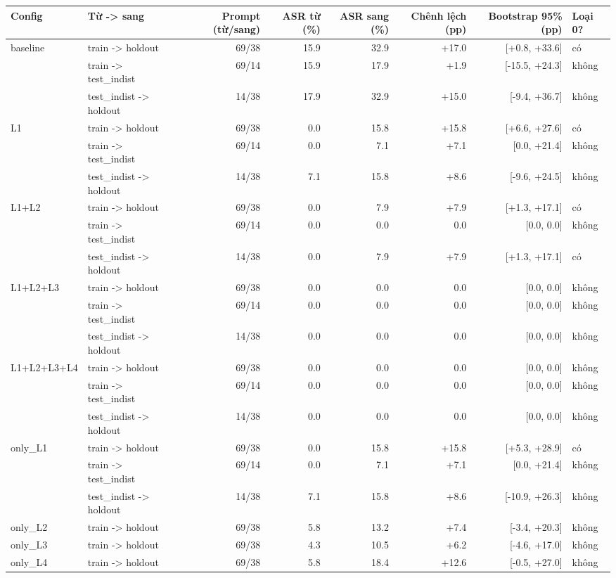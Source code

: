 \begin{tabular}{llrrrrrl}
\toprule
Config & Từ -> sang & Prompt (từ/sang) & ASR từ (\%) & ASR sang (\%) & Chênh lệch (pp) & Bootstrap 95\% (pp) & Loại 0? \\
\midrule
baseline & train -> holdout & 69/38 & 15.9 & 32.9 & +17.0 & [+0.8, +33.6] & có \\
 & train -> test\_indist & 69/14 & 15.9 & 17.9 & +1.9 & [-15.5, +24.3] & không \\
 & test\_indist -> holdout & 14/38 & 17.9 & 32.9 & +15.0 & [-9.4, +36.7] & không \\
\midrule
L1 & train -> holdout & 69/38 & 0.0 & 15.8 & +15.8 & [+6.6, +27.6] & có \\
 & train -> test\_indist & 69/14 & 0.0 & 7.1 & +7.1 & [0.0, +21.4] & không \\
 & test\_indist -> holdout & 14/38 & 7.1 & 15.8 & +8.6 & [-9.6, +24.5] & không \\
\midrule
L1+L2 & train -> holdout & 69/38 & 0.0 & 7.9 & +7.9 & [+1.3, +17.1] & có \\
 & train -> test\_indist & 69/14 & 0.0 & 0.0 & 0.0 & [0.0, 0.0] & không \\
 & test\_indist -> holdout & 14/38 & 0.0 & 7.9 & +7.9 & [+1.3, +17.1] & có \\
\midrule
L1+L2+L3 & train -> holdout & 69/38 & 0.0 & 0.0 & 0.0 & [0.0, 0.0] & không \\
 & train -> test\_indist & 69/14 & 0.0 & 0.0 & 0.0 & [0.0, 0.0] & không \\
 & test\_indist -> holdout & 14/38 & 0.0 & 0.0 & 0.0 & [0.0, 0.0] & không \\
\midrule
L1+L2+L3+L4 & train -> holdout & 69/38 & 0.0 & 0.0 & 0.0 & [0.0, 0.0] & không \\
 & train -> test\_indist & 69/14 & 0.0 & 0.0 & 0.0 & [0.0, 0.0] & không \\
 & test\_indist -> holdout & 14/38 & 0.0 & 0.0 & 0.0 & [0.0, 0.0] & không \\
\midrule
only\_L1 & train -> holdout & 69/38 & 0.0 & 15.8 & +15.8 & [+5.3, +28.9] & có \\
 & train -> test\_indist & 69/14 & 0.0 & 7.1 & +7.1 & [0.0, +21.4] & không \\
 & test\_indist -> holdout & 14/38 & 7.1 & 15.8 & +8.6 & [-10.9, +26.3] & không \\
\midrule
only\_L2 & train -> holdout & 69/38 & 5.8 & 13.2 & +7.4 & [-3.4, +20.3] & không \\
\midrule
only\_L3 & train -> holdout & 69/38 & 4.3 & 10.5 & +6.2 & [-4.6, +17.0] & không \\
\midrule
only\_L4 & train -> holdout & 69/38 & 5.8 & 18.4 & +12.6 & [-0.5, +27.0] & không \\
\bottomrule
\end{tabular}
